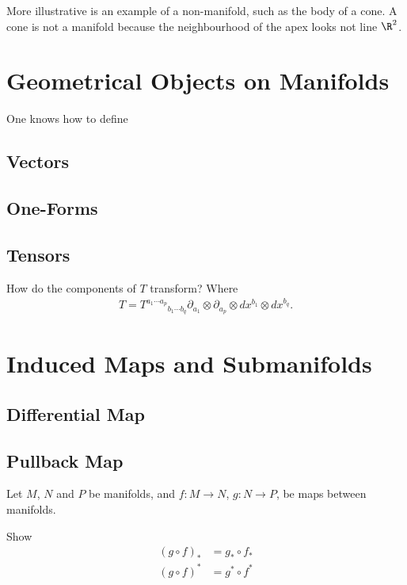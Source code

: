 More illustrative is an example of a non-manifold, such as the body of a cone. A cone is not a manifold because the neighbourhood of the apex looks not line $\R^2$.

\section{Geometrical Objects on Manifolds}

One knows how to define 

\subsection{Vectors}

\subsection{One-Forms}

\subsection{Tensors}

\begin{Ebox}
  How do the components of $T$ transform? Where 
  \begin{align}
    T= T^{a_1\cdots a_p}{}_{b_1\cdots b_q} \partial_{a_1}\otimes\partial_{a_p}\otimes dx^{b_1}\otimes dx^{b_q}.
  \end{align}
\end{Ebox}

\section{Induced Maps and Submanifolds}

\subsection{Differential Map}

\subsection{Pullback Map}

\begin{Ebox}
  Let $M$, $N$ and $P$ be manifolds, and $ f:M\to N$, $g:N\to P$,  be maps between manifolds. 

  Show
  \begin{align*}
    (g\circ f)_* &= g_*\circ f_*\\
    (g\circ f)^* &= g^*\circ f^*
  \end{align*}
\end{Ebox}

